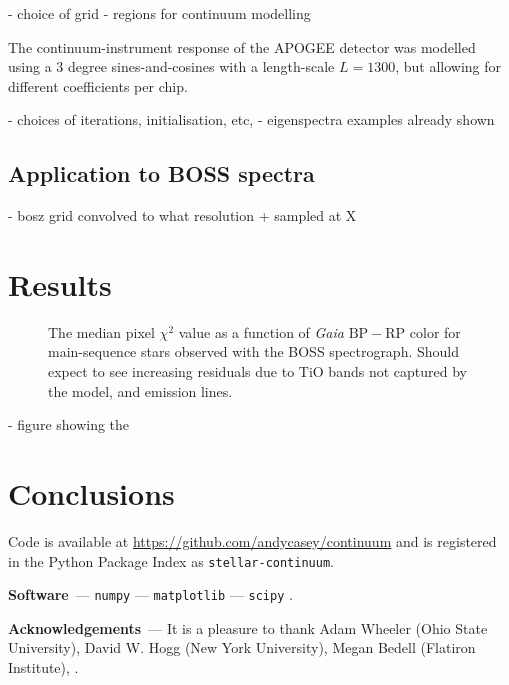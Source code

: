 \documentclass[modern]{aastex631}
\renewcommand{\paragraph}[1]{\medskip\par\noindent\textbf{#1}~---}
\newcommand{\todo}[1]{\textcolor{tab:blue}{#1}}
\begin{document}
- choice of grid
- regions for continuum modelling

The continuum-instrument response of the APOGEE detector was modelled using a 3 degree sines-and-cosines with a length-scale $L = 1300$, but allowing for different coefficients per chip.

- choices of iterations, initialisation, etc, 
- eigenspectra examples already shown



\subsection{Application to BOSS spectra}

- bosz grid convolved to what resolution + sampled at X


\section{Results}\label{sec:results}


\begin{figure*}
    \caption{The median pixel $\chi^2$ value as a function of \emph{Gaia} $\mathrm{BP} - \mathrm{RP}$ color for main-sequence stars observed with the BOSS spectrograph. \todo{Should expect to see increasing residuals due to TiO bands not captured by the model, and emission lines.}}
\end{figure*}


- figure showing the 

\section{Conclusions}\label{sec:conclusions}



Code is available at \url{https://github.com/andycasey/continuum} and is registered in the Python Package Index as \texttt{stellar-continuum}.

\paragraph{Software}
\texttt{numpy} \citep{numpy} ---
\texttt{matplotlib} \citep{matplotlib} ---
\texttt{scipy} \citep{scipy}.

\paragraph{Acknowledgements}
It is a pleasure to thank
    Adam Wheeler (Ohio State University),
    David W. Hogg (New York University),
    Megan Bedell (Flatiron Institute),
.

%
\end{document}
